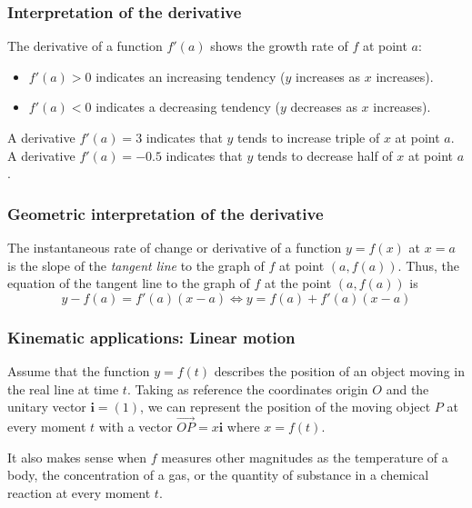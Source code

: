 \begin{frame}
\frametitle{Interpretation of the derivative}
The derivative of a function $f'(a)$ shows the growth rate of $f$ at point $a$:
\begin{itemize}
\item $f'(a)>0$ indicates an increasing tendency ($y$ increases as $x$ increases).
\item $f'(a)<0$ indicates a decreasing tendency ($y$ decreases as $x$ increases).
\end{itemize}

 A derivative $f'(a)=3$ indicates that $y$ tends to increase triple of $x$ at point $a$. 
 A derivative $f'(a)=-0.5$ indicates that $y$ tends to decrease half of $x$ at point $a$. 
\end{frame}


\begin{frame}
\frametitle{Geometric interpretation of the derivative}

The instantaneous rate of change or derivative of a function $y=f(x)$ at $x=a$ is the slope of the \emph{tangent line} to the graph of $f$ at point $(a,f(a))$. 
Thus, the equation of the tangent line to the graph of $f$ at the point $(a,f(a))$ is
\[
y-f(a) = f'(a)(x-a) \Leftrightarrow y = f(a)+f'(a)(x-a)
\]
\begin{center}

\end{center}
\end{frame}


\begin{frame}
\frametitle{Kinematic applications: Linear motion}
Assume that the function $y=f(t)$ describes the position of an object moving in the real line at time $t$.
Taking as reference the coordinates origin $O$ and the unitary vector $\mathbf{i}=(1)$, we can represent the position of the moving object $P$ at every moment $t$ with a vector $\vec{OP}=x\mathbf{i}$ where $x=f(t)$.
\begin{center}

\end{center}

 It also makes sense when $f$ measures other magnitudes as the temperature of a body, the concentration of a gas, or the quantity of substance in a chemical reaction at every moment $t$.
\end{frame}


